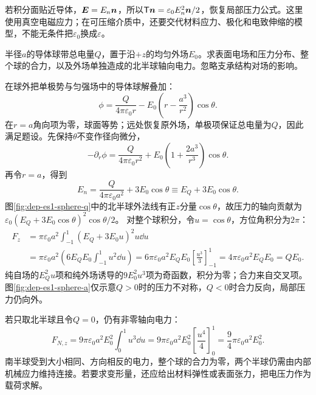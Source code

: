 若积分面贴近导体，$\bm{E}=E_n\bm{n}$，所以$\mathsf T\bm{n}=\varepsilon_0E_n^2\bm{n}/2$，恢复局部压力公式。这里使用真空电磁应力；在可压缩介质中，还要交代材料应力、极化和电致伸缩的模型，不能无条件把$\varepsilon_0$换成$\varepsilon$。

\begin{example}[带电导体球的局部压力与整体受力]
半径$a$的导体球带总电量$Q$，置于沿$+z$的均匀外场$E_0$。求表面电场和压力分布、整个球的合力，以及外场单独造成的北半球轴向电力。忽略支承结构对场的影响。
\end{example}
\begin{solution}
在球外把单极势与匀强场中的导体球解叠加：
\[
 \phi=\frac{Q}{4\pi\varepsilon_0r}
 -E_0\left(r-\frac{a^3}{r^2}\right)\cos\theta.
\]
在$r=a$角向项为零，球面等势；远处恢复原外场，单极项保证总电量为$Q$，因此满足题设。先保持$\theta$不变作径向微分，
\[-\partial_r\phi=\frac{Q}{4\pi\varepsilon_0r^2}
+E_0\left(1+\frac{2a^3}{r^3}\right)\cos\theta.\]
再令$r=a$，得到
\[
 E_n=\frac{Q}{4\pi\varepsilon_0a^2}+3E_0\cos\theta
 \equiv E_Q+3E_0\cos\theta.
\]
图\ref{fig:dep-es1-sphere-q}中的北半球外法线有正$z$分量$\cos\theta$，故压力的轴向贡献为$\varepsilon_0(E_Q+3E_0\cos\theta)^2\cos\theta/2$。
对整个球积分，令$u=\cos\theta$，方位角积分为$2\pi$：
\begin{align*}
 F_z&=\pi\varepsilon_0a^2\int_{-1}^1(E_Q+3E_0u)^2u\dd u\\
 &=\pi\varepsilon_0a^2\left(6E_QE_0\int_{-1}^1u^2\dd u\right)
 =6\pi\varepsilon_0a^2E_QE_0\left[\frac{u^3}{3}\right]_{-1}^1
 =4\pi\varepsilon_0a^2E_QE_0=QE_0.
\end{align*}
纯自场的$E_Q^2u$项和纯外场诱导的$9E_0^2u^3$项为奇函数，积分为零；合力来自交叉项。图\ref{fig:dep-es1-sphere-a}仅示意$Q>0$时的压力不对称，$Q<0$时合力反向，局部压力仍向外。

若只取北半球且令$Q=0$，仍有非零轴向电力：
\[
 F_{N,z}=9\pi\varepsilon_0a^2E_0^2\int_0^1u^3\dd u
 =9\pi\varepsilon_0a^2E_0^2\left[\frac{u^4}{4}\right]_0^1
 =\frac94\pi\varepsilon_0a^2E_0^2.
\]
南半球受到大小相同、方向相反的电力，整个球的合力为零，两个半球仍需由内部机械应力维持连接。若要求变形量，还应给出材料弹性或表面张力，把电压力作为载荷求解。
\end{solution}
